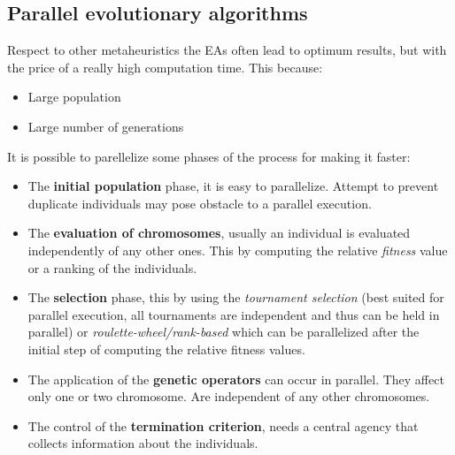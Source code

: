 \documentclass{article}
\begin{document}
\subsection{Parallel evolutionary algorithms}
Respect to other metaheuristics the EAs often lead to optimum results, but with the price of a
really high computation time.
This because:
\begin{itemize}
    \item Large population
    \item Large number of generations
\end{itemize}
It is possible to parellelize some phases of the process for making it faster:
\begin{itemize}
    \item The \textbf{initial population} phase, it is easy to parallelize. Attempt to prevent
    duplicate individuals may pose obstacle to a parallel execution.

    \item The \textbf{evaluation of chromosomes}, usually an individual is evaluated
    independently of any other ones. This by computing the relative \textit{fitness} value
    or a ranking of the individuals.
    \item The \textbf{selection} phase, this by using the \textit{tournament selection} (best
    suited for parallel execution, all tournaments are independent and thus can be held in parallel) or
    \textit{roulette-wheel/rank-based} which can be parallelized after the initial step of computing
    the relative fitness values.

    \item The application of the \textbf{genetic operators} can occur in parallel. They affect only
    one or two chromosome. Are independent of any other chromosomes.
    \item The control of the \textbf{termination criterion}, needs a central agency that collects information
    about the individuals.
\end{itemize}
\end{document}
